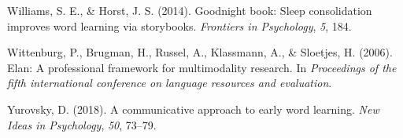 \documentclass[floatsintext,man]{apa6}
\theoremstyle{definition}
\theoremstyle{definition}
\theoremstyle{definition}
\theoremstyle{remark}
\begin{document}
\hypertarget{ref-williams2014goodnight}{}
Williams, S. E., \& Horst, J. S. (2014). Goodnight book: Sleep
consolidation improves word learning via storybooks. \emph{Frontiers in
Psychology}, \emph{5}, 184.

\hypertarget{ref-ELAN}{}
Wittenburg, P., Brugman, H., Russel, A., Klassmann, A., \& Sloetjes, H.
(2006). Elan: A professional framework for multimodality research. In
\emph{Proceedings of the fifth international conference on language
resources and evaluation}.

\hypertarget{ref-yurovsky2018communicative}{}
Yurovsky, D. (2018). A communicative approach to early word learning.
\emph{New Ideas in Psychology}, \emph{50}, 73--79.

\endgroup
\end{document}
